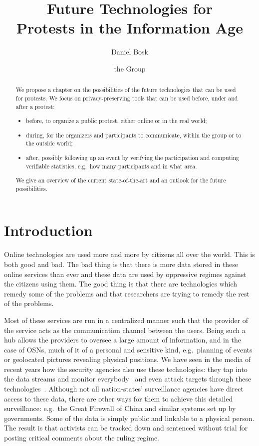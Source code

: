 \documentclass[a4paper]{llncs}
\title{%
  Future Technologies for\\
  Protests in the Information Age
}
\author{%
  Daniel Bosk
  \and
  the Group
}
\institute{%
  School of Computer Science and Communication,\\
  KTH Royal Institute of Technology,
  Stockholm\\
  \email{dbosk@kth.se}
}
\begin{document}
\maketitle

\begin{abstract}
  We propose a chapter on the possibilities of the future technologies that can 
  be used for protests.
  We focus on privacy-preserving tools that can be used before, under and after 
  a protest:
  \begin{itemize}
    \item before, to organize a public protest, either online or in the real 
      world;
    \item during, for the organizers and participants to communicate, within 
      the group or to the outside world;
    \item after, possibly following up an event by verifying the participation 
      and computing verifiable statistics, e.g.\ how many participants and in 
      what area.
  \end{itemize}
  We give an overview of the current state-of-the-art and an outlook for the 
  future possibilities.
\end{abstract}


\section{Introduction}

Online technologies are used more and more by citizens all over the world.
This is both good and bad.
The bad thing is that there is more data stored in these online services than 
ever and these data are used by oppressive regimes against the citizens using 
them.
The good thing is that there are technologies which remedy some of the problems 
and that researchers are trying to remedy the rest of the problems.

Most of these services are run in a centralized manner such that the provider 
of the service acts as the communication channel between the users.
Being such a hub allows the providers to oversee a large amount of information, 
and in the case of \acp{OSN}, much of it of a personal and sensitive kind, 
e.g.\ planning of events or geolocated pictures revealing physical positions.
We have seen in the media of recent years how the security agencies also use 
these technologies: they tap into the data streams and monitor 
everybody~\cite{BoundlessInformant,XKeyscore} and even attack targets through 
these technologies~\cite{Quantum}.
Although not all nation-states' surveillance agencies have direct access to 
these data, there are other ways for them to achieve this detailed 
surveillance: e.g.\ the Great Firewall of China and similar systems set up by 
governments.
Some of the data is simply public and linkable to a physical person.
The result is that activists can be tracked down and sentenced without trial 
for posting critical comments about the ruling regime.
\end{document}
